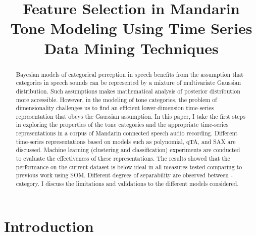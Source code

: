 \documentclass{article}
\title{Feature Selection in Mandarin Tone Modeling Using Time Series Data Mining Techniques}
\author{ }
\begin{document}
\maketitle


\begin{abstract}
Bayesian models of categorical perception in speech benefits from the assumption that categories in speech sounds can be represented by a mixture of multivariate Gaussian distribution. Such assumptions makes mathematical analysis of posterior distribution more accessible. However, in the modeling of tone categories, the problem of dimensionality challenges us to find an efficient lower-dimension time-series representation that obeys the Gaussian assumption. In this paper, I take the first steps in exploring the properties of the tone categories and the appropriate time-series representations in a corpus of Mandarin connected speech audio recording. Different time-series representations based on models such as polynomial, qTA, and SAX are discussed. Machine learning (clustering and classification) experiments are conducted to evaluate the effectiveness of these representations. The results showed that the performance on the current dataset is below ideal in all measures tested comparing to previous work using SOM. Different degrees of separability are observed between - category. I discuss the limitations and validations to the different models considered.

\end{abstract}









\section{Introduction}\label{sec:introduction}

\end{document}
